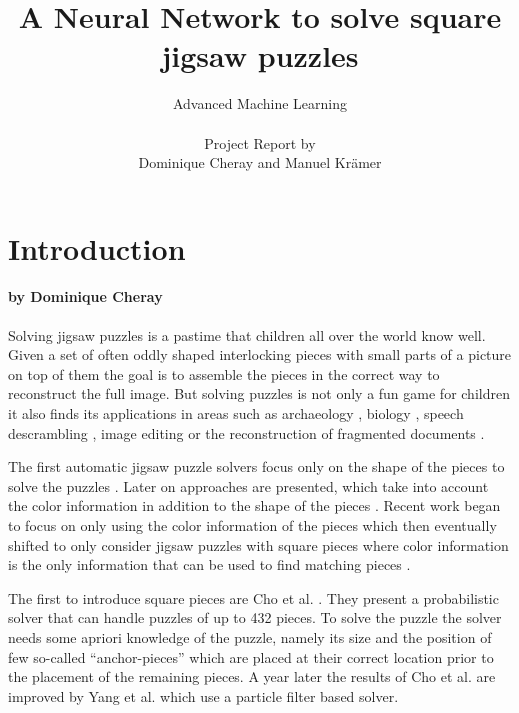 \documentclass[11pt]{report}
\title{\textbf{A Neural Network to solve square jigsaw puzzles}}
\author{Advanced Machine Learning \\ \\
  Project Report by \\
  Dominique Cheray and Manuel Krämer}
\begin{document}
\maketitle

\tableofcontents

\chapter{Introduction}
\subsubsection*{by Dominique Cheray}
Solving jigsaw puzzles is a pastime that children all over the world know well.
Given a set of often oddly shaped interlocking pieces with small parts of a
picture on top of them the goal is to assemble the pieces in the correct way to
reconstruct the full image. But solving puzzles is not only a fun  game for children it
also finds its applications in areas such as archaeology \cite{brown2008system,
  liu2011automated, koller2006computer}, biology
\cite{marande2007mitochondrial}, speech descrambling \cite{zhao2007puzzle},
image editing \cite{cho2008patch} or the reconstruction of fragmented documents
\cite{zhu2008globally}.

The first automatic jigsaw puzzle solvers focus only on the shape of the pieces
to solve the puzzles \cite{freeman1964apictorial, wolfson1988solving,
webster1990computer, kong2001solving}. Later on approaches are presented, which
take into account the color information in addition to the shape of the pieces
\cite{kosiba1994automatic, makridis2006new, sagiroglu2006texture}. Recent work
began to focus on only using the color information of the pieces
\cite{nielsen2008solving} which then eventually shifted to only consider jigsaw
puzzles with square pieces where color information is the only information that
can be used to find matching pieces \cite{Cho2010, yang2011particle,
  Pomeranz2011, gallagher2012jigsaw, son2014solving, sholomon2013genetic,
  Paikin2015, sholomon2016dnn}.

The first to introduce square pieces are Cho et al. \cite{Cho2010}. They present
a probabilistic solver that can handle puzzles of up to 432 pieces. To solve the
puzzle the solver needs some apriori knowledge of the puzzle, namely its size
and the position of few so-called ``anchor-pieces'' which are placed at their
correct location prior to the placement of the remaining pieces. A year later
the results of Cho et al. are improved by Yang et al. \cite{yang2011particle}
which use a particle filter based solver.
\end{document}
